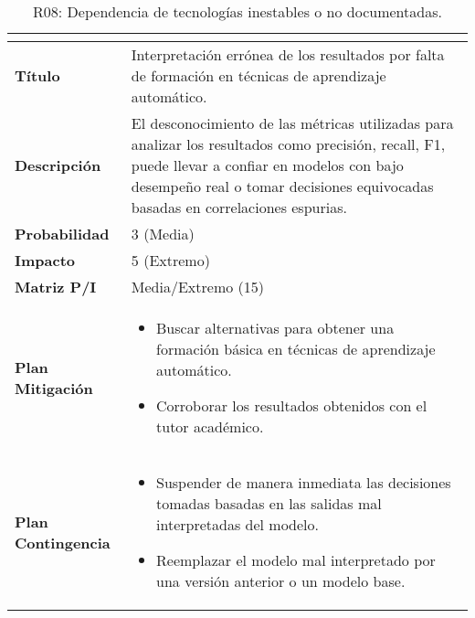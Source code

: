 \begin{table}[H]
\centering
\begin{tabular}{|>{\bfseries}l|p{10cm}|}
\hline
\rowcolor{lightgray}
\multicolumn{2}{|c|}{\textbf{Riesgo R08}} \\ \hline
Título & Interpretación errónea de los resultados por falta de formación en técnicas de aprendizaje automático.  \\ \hline
Descripción & El desconocimiento de las métricas utilizadas para analizar los resultados como precisión, recall, F1, puede llevar a confiar en modelos con bajo desempeño real o tomar decisiones equivocadas basadas en correlaciones espurias. \\ \hline
Probabilidad & 3 (Media) \cellcolor{yellowrisk} \\ \hline
Impacto & 5 (Extremo) \cellcolor{redrisk} \\ \hline
Matriz P/I & Media/Extremo (15) \\ \hline
Plan Mitigación & 
\begin{itemize}
\item Buscar alternativas para obtener una formación básica en técnicas de aprendizaje automático.
\item Corroborar los resultados obtenidos con el tutor académico.
\end{itemize} \\ \hline
Plan Contingencia & 
\begin{itemize}
\item Suspender de manera inmediata las decisiones tomadas basadas en las salidas mal interpretadas del modelo.
\item Reemplazar el modelo mal interpretado por una versión anterior o un modelo base.
\end{itemize} \\ \hline
\end{tabular}
\caption{R08: Dependencia de tecnologías inestables o no documentadas.}
\label{tab:R08}
\end{table}

